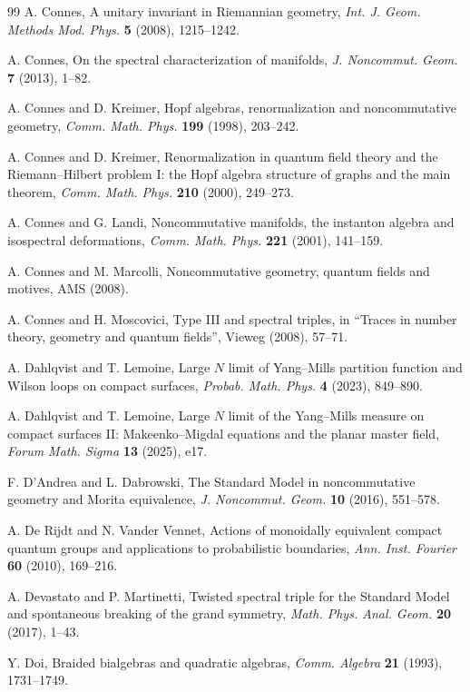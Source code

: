 \documentclass[11pt]{amsart}
\theoremstyle{definition}
\begin{document}
\begin{thebibliography}{99}
 A. Connes, A unitary invariant in Riemannian geometry, {\em Int. J. Geom. Methods Mod. Phys.} {\bf 5} (2008), 1215--1242.

 A. Connes, On the spectral characterization of manifolds, {\em J. Noncommut. Geom.} {\bf 7} (2013), 1--82.

 A. Connes and D. Kreimer, Hopf algebras, renormalization and noncommutative geometry, {\em Comm. Math. Phys.} {\bf 199} (1998), 203--242.

 A. Connes and D. Kreimer, Renormalization in quantum field theory and the Riemann--Hilbert problem I: the Hopf algebra structure of graphs and the main theorem, {\em Comm. Math. Phys.} {\bf 210} (2000), 249--273.

 A. Connes and G. Landi, Noncommutative manifolds, the instanton algebra and isospectral deformations, {\em Comm. Math. Phys.} {\bf 221} (2001), 141--159.

 A. Connes and M. Marcolli, Noncommutative geometry, quantum fields and motives, AMS (2008).

 A. Connes and H. Moscovici, Type III and spectral triples, in ``Traces in number theory, geometry and quantum fields'', Vieweg (2008), 57--71.

 A. Dahlqvist and T. Lemoine, Large $N$ limit of Yang--Mills partition function and Wilson loops on compact surfaces, {\em Probab. Math. Phys.} {\bf 4} (2023), 849--890.

 A. Dahlqvist and T. Lemoine, Large $N$ limit of the Yang--Mills measure on compact surfaces II: Makeenko--Migdal equations and the planar master field, {\em Forum Math. Sigma} {\bf 13} (2025), e17.

 F. D'Andrea and L. Dabrowski, The Standard Model in noncommutative geometry and Morita equivalence, {\em J. Noncommut. Geom.} {\bf 10} (2016), 551--578.

 A. De Rijdt and N. Vander Vennet, Actions of monoidally equivalent compact quantum groups and applications to probabilistic boundaries, {\em Ann. Inst. Fourier} {\bf 60} (2010), 169--216.

 A. Devastato and P. Martinetti, Twisted spectral triple for the Standard Model and spontaneous breaking of the grand symmetry, {\em Math. Phys. Anal. Geom.} {\bf 20} (2017), 1--43.

 Y. Doi, Braided bialgebras and quadratic algebras, {\em Comm. Algebra} {\bf 21} (1993), 1731--1749.


\end{thebibliography}
\end{document}
